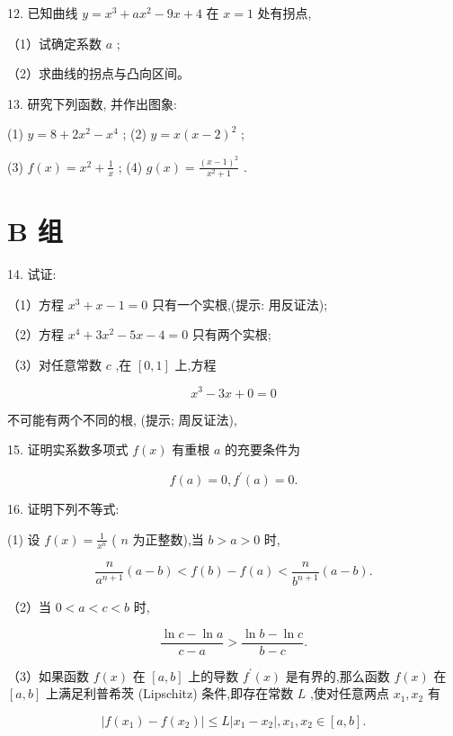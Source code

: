 \documentclass[10pt]{article}
\begin{document}
12. 已知曲线 \(y = {x}^{3} + a{x}^{2} - {9x} + 4\) 在 \(x = 1\) 处有拐点,

（1）试确定系数 \(a\) ;

（2）求曲线的拐点与凸向区间。

13. 研究下列函数, 并作出图象:

(1) \(y = 8 + 2{x}^{2} - {x}^{4}\) ; (2) \(y = x{\left( x - 2\right) }^{2}\) ;

(3) \(f\left( x\right) = {x}^{2} + \frac{1}{x}\) ; (4) \(g\left( x\right) = \frac{{\left( x - 1\right) }^{2}}{{x}^{2} + 1}\) .

\section*{B 组}

14. 试证:

（1）方程 \({x}^{3} + x - 1 = 0\) 只有一个实根,(提示: 用反证法);

（2）方程 \({x}^{4} + 3{x}^{2} - {5x} - 4 = 0\) 只有两个实根;

（3）对任意常数 \(c\) ,在 \(\left\lbrack {0,1}\right\rbrack\) 上,方程

\[
{x}^{3} - {3x} + 0 = 0
\]

不可能有两个不同的根, (提示; 周反证法),

15. 证明实系数多项式 \(f\left( x\right)\) 有重根 \(a\) 的充要条件为

\[
f\left( a\right) = 0,{f}^{\prime }\left( a\right) = 0.
\]

16. 证明下列不等式:

(1) 设 \(f\left( x\right) = \frac{1}{{x}^{n}}\) ( \(n\) 为正整数),当 \(b > a > 0\) 时,

\[
\frac{n}{{a}^{n + 1}}\left( {a - b}\right) < f\left( b\right) - f\left( a\right) < \frac{n}{{b}^{n + 1}}\left( {a - b}\right) .
\]

（2）当 \(0 < a < c < b\) 时,

\[
\frac{\ln c - \ln a}{c - a} > \frac{\ln b - \ln c}{b - c}.
\]

（3）如果函数 \(f\left( x\right)\) 在 \(\left\lbrack {a,b}\right\rbrack\) 上的导数 \({f}^{\prime }\left( x\right)\) 是有界的,那么函数 \(f\left( x\right)\) 在 \(\left\lbrack {a,b}\right\rbrack\) 上满足利普希茨 (Lipschitz) 条件,即存在常数 \(L\) ,使对任意两点 \({x}_{1},{x}_{2}\) 有

\[
\left| {f\left( {x}_{1}\right) - f\left( {x}_{2}\right) }\right| \leq L\left| {{x}_{1} - {x}_{2}}\right| ,{x}_{1},{x}_{2} \in \left\lbrack {a,b}\right\rbrack .
\]
\end{document}
